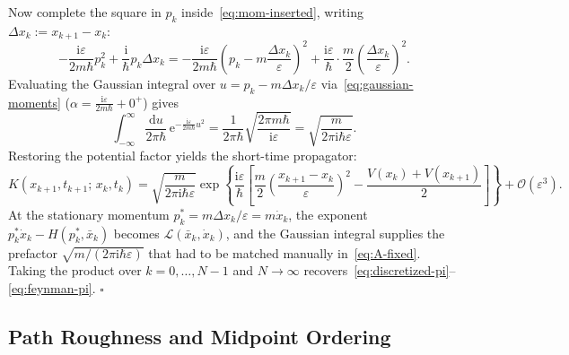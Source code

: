\documentclass[11pt,a4paper]{article}
\newcommand{\ii}{\mathrm{i}}
\newcommand{\dd}{\mathrm{d}}
\newcommand{\ee}{\mathrm{e}}
\newcommand{\Lag}{\mathcal{L}}
\newcommand{\order}{\mathcal{O}}
\begin{document}
Now complete the square in $p_k$ inside~\eqref{eq:mom-inserted}, writing $\Delta x_k := x_{k+1}-x_k$:
\begin{equation}
    -\frac{\ii\varepsilon}{2m\hbar}p_k^2 + \frac{\ii}{\hbar}p_k\Delta x_k
    = -\frac{\ii\varepsilon}{2m\hbar}\!\left(p_k - m\frac{\Delta x_k}{\varepsilon}\right)^2
      + \frac{\ii\varepsilon}{\hbar}\cdot\frac{m}{2}\!\left(\frac{\Delta x_k}{\varepsilon}\right)^2.
\end{equation}
Evaluating the Gaussian integral over $u = p_k - m\Delta x_k/\varepsilon$ via~\eqref{eq:gaussian-moments} ($\alpha = \frac{\ii\varepsilon}{2m\hbar}+0^+$) gives
\begin{equation}
    \int_{-\infty}^{\infty}\frac{\dd u}{2\pi\hbar}\,\ee^{-\frac{\ii\varepsilon}{2m\hbar}u^2}
    = \frac{1}{2\pi\hbar}\sqrt{\frac{2\pi m\hbar}{\ii\varepsilon}}
    = \sqrt{\frac{m}{2\pi\ii\hbar\varepsilon}}.
\end{equation}
Restoring the potential factor yields the short-time propagator:
\begin{equation}
    K(x_{k+1},t_{k+1};\,x_k,t_k)
    = \sqrt{\frac{m}{2\pi\ii\hbar\varepsilon}}
      \exp\!\left\{\frac{\ii\varepsilon}{\hbar}\left[
          \frac{m}{2}\!\left(\frac{x_{k+1}-x_k}{\varepsilon}\right)^2
          - \frac{V(x_k)+V(x_{k+1})}{2}
      \right]\right\} + \order(\varepsilon^3).
    \label{eq:infinitesimal-propagator}
\end{equation}
At the stationary momentum $p_k^* = m\Delta x_k/\varepsilon = m\dot x_k$, the exponent $p_k^*\dot x_k - H(p_k^*,\bar x_k)$ becomes $\Lag(\bar x_k,\dot x_k)$, and the Gaussian integral supplies the prefactor $\sqrt{m/(2\pi\ii\hbar\varepsilon)}$ that had to be matched manually in~\eqref{eq:A-fixed}. Taking the product over $k=0,\dots,N-1$ and $N\to\infty$ recovers~\eqref{eq:discretized-pi}--\eqref{eq:feynman-pi}. \hfill$\square$

\subsection{Path Roughness and Midpoint Ordering}
\end{document}
